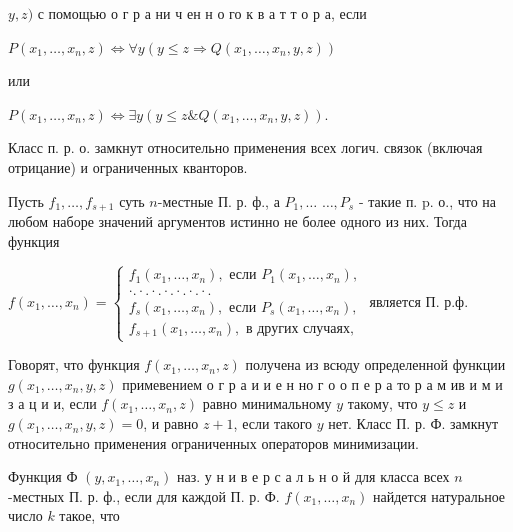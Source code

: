\documentclass[10pt]{article}
\begin{document}
$y, z)$ с помощью о г р а ни ч ен н о го к в а т т о р а, если



$P\left(x_{1}, \ldots, x_{n}, z\right) \Leftrightarrow \forall y\left(y \leqslant z \Rightarrow Q\left(x_{1}, \ldots, x_{n}, y, z\right)\right)$



или



$P\left(x_{1}, \ldots, x_{n}, z\right) \Leftrightarrow \exists y\left(y \leqslant z \& Q\left(x_{1}, \ldots, x_{n}, y, z\right)\right)$.



Класс п. р. о. замкнут относительно применения всех логич. связок (включая отрицание) и ограниченных кванторов.



Пусть $f_{1}, \ldots, f_{s+1}$ суть $n$-местные П. р. ф., а $P_{1}, \ldots$ $\ldots, P_{s}$ - такие п. p. о., что на любом наборе значений аргументов истинно не более одного из них. Тогда функция



$f\left(x_{1}, \ldots, x_{n}\right)=\left\{\begin{array}{c}f_{1}\left(x_{1}, \ldots, x_{n}\right), \text { если } P_{1}\left(x_{1}, \ldots, x_{n}\right), \\ \cdot . \cdot . \cdot . \cdot . \cdot . \cdot . \cdot . \\ f_{s}\left(x_{1}, \ldots, x_{n}\right), \text { если } P_{s}\left(x_{1}, \ldots, x_{n}\right), \\ f_{s+1}\left(x_{1}, \ldots, x_{n}\right), \text { в других случаях, }\end{array}\right.$ является П. р.ф.



Говорят, что функция $f\left(x_{1}, \ldots, x_{n}, z\right)$ получена из всюду определенной функции $g\left(x_{1}, \ldots, x_{n}, y, z\right)$ примевением о г р а и и е н но г о о п е р а то р а м ив и м и з а ц и и, если $f\left(x_{1}, \ldots, x_{n}, z\right)$ равно минимальному $y$ такому, что $y \leqslant z$ и $g\left(x_{1}, \ldots, x_{n}, y, z\right)=0$, и равно $z+1$, если такого $y$ нет. Класс П. р. Ф. замкнут относительно применения ограниченных операторов минимизации.



Функция Ф $\left(y, x_{1}, \ldots, x_{n}\right)$ наз. у н и в е р с а л ь н о й для класса всех $n$-местных П. р. ф., если для каждой П. р. Ф. $f\left(x_{1}, \ldots, x_{n}\right)$ найдется натуральное число $k$ такое, что
\end{document}
